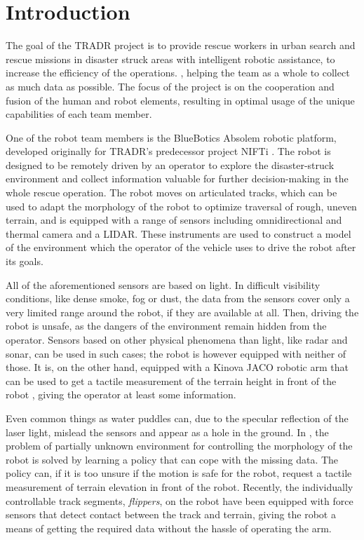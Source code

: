 \documentclass[buriama8_dp.tex]{subfiles}
\begin{document}
\chapter{Introduction}

The goal of the TRADR project \cite{tradr} is to provide rescue workers in urban search and rescue missions in disaster struck areas with intelligent robotic assistance, to increase the efficiency of the operations. \cite{tradr}, helping the team as a whole to collect as much data as possible. The focus of the project is on the cooperation and fusion of the human and robot elements, resulting in optimal usage of the unique capabilities of each team member.

One of the robot team members is the BlueBotics Absolem robotic platform, developed originally for TRADR's predecessor project NIFTi \cite{nifti}. The robot is designed to be remotely driven by an operator to explore the disaster-struck environment and collect information valuable for further decision-making in the whole rescue operation. The robot moves on articulated tracks, which can be used to adapt the morphology of the robot to optimize traversal of rough, uneven terrain, and is equipped with a range of sensors including omnidirectional and thermal camera and a LIDAR. These instruments are used to construct a model of the environment which the operator of the vehicle uses to drive the robot after its goals.

All of the aforementioned sensors are based on light. In difficult visibility conditions, like dense smoke, fog or dust, the data from the sensors cover only a very limited range around the robot, if they are available at all. Then, driving the robot is unsafe, as the dangers of the environment remain hidden from the operator. Sensors based on other physical phenomena than light, like radar and sonar, can be used in such cases; the robot is however equipped with neither of those. It is, on the other hand, equipped with a Kinova JACO robotic arm that can be used to get a tactile measurement of the terrain height in front of the robot \cite{vojta}, giving the operator at least some information.

Even common things as water puddles can, due to the specular reflection of the laser light, mislead the sensors and appear as a hole in the ground. In \cite{adapt_trave}, the problem of partially unknown environment for controlling the morphology of the robot is solved by learning a policy that can cope with the missing data. The policy can, if it is too unsure if the motion is safe for the robot, request a tactile measurement of terrain elevation in front of the robot. Recently, the individually controllable track segments, \emph{flippers}, on the robot have been equipped with force sensors that detect contact between the track and terrain, giving the robot a means of getting the required data without the hassle of operating the arm.
\end{document}
